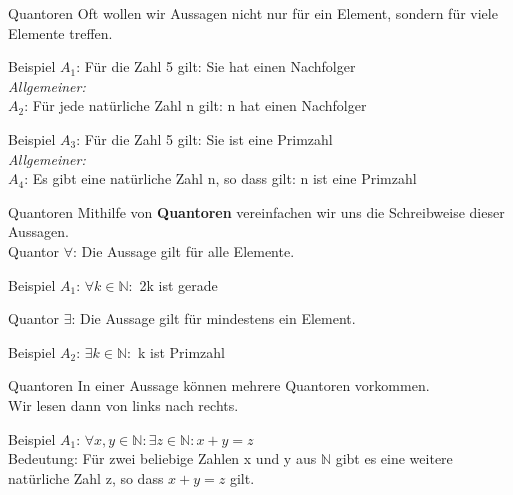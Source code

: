 \begin{frame}[fragile]{Quantoren}
    Oft wollen wir Aussagen nicht nur für ein Element, sondern für viele Elemente treffen.
    \begin{exampleblock}{Beispiel}
        $A_1$: Für die Zahl 5 gilt: Sie hat einen Nachfolger\\
        \emph{Allgemeiner:}\\
        $A_2$: Für jede natürliche Zahl n gilt: n hat einen Nachfolger
    \end{exampleblock}
    \begin{exampleblock}{Beispiel}
        $A_3$: Für die Zahl 5 gilt: Sie ist eine Primzahl\\
        \emph{Allgemeiner:}\\
        $A_4$: Es gibt eine natürliche Zahl n, so dass gilt: n ist eine Primzahl
    \end{exampleblock}
\end{frame}

\begin{frame}[fragile]{Quantoren}
    Mithilfe von \textbf{Quantoren} vereinfachen wir uns die Schreibweise dieser Aussagen.\\
    \vspace{0.5cm}
    Quantor \alert{$\forall$}: Die Aussage gilt für alle Elemente.\\
    \begin{exampleblock}{Beispiel}
        $A_1$: $\forall k \in \mathbb{N}:$ 2k ist gerade
    \end{exampleblock}
    Quantor \alert{$\exists$}: Die Aussage gilt für mindestens ein Element.\\
    \begin{exampleblock}{Beispiel}
        $A_2$: $\exists k \in \mathbb{N}:$ k ist Primzahl
    \end{exampleblock}
\end{frame}

\begin{frame}[fragile]{Quantoren}
    In einer Aussage können mehrere Quantoren vorkommen.\\
    Wir lesen dann von links nach rechts.
    \begin{exampleblock}{Beispiel}
        $A_1$: $\forall x,y \in \mathbb{N}: \exists z \in \mathbb{N}: x+y = z$\\
        Bedeutung: Für zwei beliebige Zahlen x und y aus $\mathbb{N}$ gibt es eine weitere natürliche Zahl z, so dass $x+y=z$ gilt.
    \end{exampleblock}
\end{frame}

